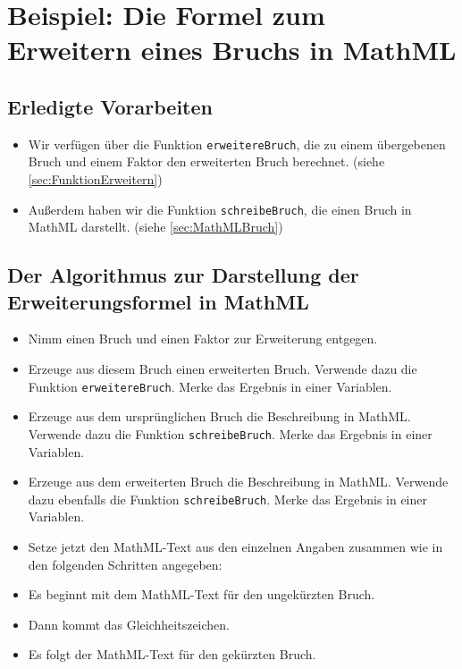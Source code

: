 \section{Beispiel: Die Formel zum Erweitern eines Bruchs in MathML}

\subsection*{Erledigte Vorarbeiten}

\begin{itemize}
	\item Wir verfügen über die Funktion \texttt{erweitereBruch}, die zu einem übergebenen Bruch und einem Faktor den erweiterten Bruch berechnet. (siehe \ref{sec:FunktionErweitern})
	\item Außerdem haben wir die Funktion \texttt{schreibeBruch}, die einen Bruch in MathML darstellt. (siehe \ref{sec:MathMLBruch})
\end{itemize}

\subsection*{Der Algorithmus zur Darstellung der Erweiterungsformel in MathML}

\begin{itemize}
	\item Nimm einen Bruch und einen Faktor zur Erweiterung entgegen.
	\item Erzeuge aus diesem Bruch einen erweiterten Bruch. Verwende dazu die Funktion \texttt{erweitereBruch}. Merke das Ergebnis in einer Variablen.
	\item Erzeuge aus dem ursprünglichen Bruch die Beschreibung in MathML. Verwende dazu die Funktion \texttt{schreibeBruch}. Merke das Ergebnis in einer Variablen.
	\item Erzeuge aus dem erweiterten Bruch die Beschreibung in MathML. Verwende dazu ebenfalls die Funktion \texttt{schreibeBruch}. Merke das Ergebnis in einer Variablen.
	\item Setze jetzt den MathML-Text aus den einzelnen Angaben zusammen wie in den folgenden Schritten angegeben:
	\item Es beginnt mit dem MathML-Text für den ungekürzten Bruch.
	\item Dann kommt das Gleichheitszeichen.
	\item Es folgt der MathML-Text für den gekürzten Bruch.
\end{itemize}

